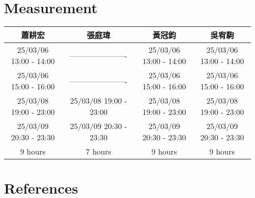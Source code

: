 \documentclass[12pt]{article}
\begin{document}
\section{Measurement}
\begin{CJK*}{UTF8}{bsmi} %

\begin{longtable}{|c|c|c|c|}
\hline
蕭耕宏 & 張庭瑋 & 黃冠鈞 & 吳宥駒 \\
\hline
\endfirsthead
\endhead

\hline
25/03/06 13:00 - 14:00 & ---------------------- & 25/03/06 13:00 - 14:00 & 25/03/06 13:00 - 14:00 \\
25/03/06 15:00 - 16:00 & ---------------------- & 25/03/06 15:00 - 16:00 & 25/03/06 15:00 - 16:00 \\
25/03/08 19:00 - 23:00 & 25/03/08 19:00 - 23:00 & 25/03/08 19:00 - 23:00 & 25/03/08 19:00 - 23:00 \\
25/03/09 20:30 - 23:30 & 25/03/09 20:30 - 23:30 & 25/03/09 20:30 - 23:30 & 25/03/09 20:30 - 23:30 \\
9 hours                & 7 hours                & 9 hours                & 9 hours                \\
\hline

\end{longtable}
\end{CJK*}


\section*{References}

\nocite{Siepe2024}
\printbibliography[heading=none]
\end{document}
